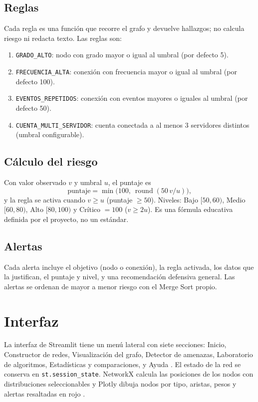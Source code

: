 \documentclass[12pt,a4paper]{article}
\begin{document}
\subsection{Reglas}
Cada regla es una función que recorre el grafo y devuelve hallazgos; no calcula riesgo ni redacta texto. Las reglas son:
\begin{enumerate}
  \item \texttt{GRADO\_ALTO}: nodo con grado mayor o igual al umbral (por defecto 5).
  \item \texttt{FRECUENCIA\_ALTA}: conexión con frecuencia mayor o igual al umbral (por defecto 100).
  \item \texttt{EVENTOS\_REPETIDOS}: conexión con eventos mayores o iguales al umbral (por defecto 50).
  \item \texttt{CUENTA\_MULTI\_SERVIDOR}: cuenta conectada a al menos 3 servidores distintos (umbral configurable).
\end{enumerate}

\subsection{Cálculo del riesgo}
Con valor observado $v$ y umbral $u$, el puntaje es
\[
  \text{puntaje} = \min\bigl(100,\ \operatorname{round}(50\,v/u)\bigr),
\]
y la regla se activa cuando $v\ge u$ (puntaje $\ge 50$). Niveles: Bajo $[50,60)$, Medio $[60,80)$, Alto $[80,100)$ y Crítico $=100$ ($v\ge 2u$). Es una fórmula educativa definida por el proyecto, no un estándar.

\subsection{Alertas}
Cada alerta incluye el objetivo (nodo o conexión), la regla activada, los datos que la justifican, el puntaje y nivel, y una recomendación defensiva general. Las alertas se ordenan de mayor a menor riesgo con el Merge Sort propio.

\section{Interfaz}
La interfaz de Streamlit tiene un menú lateral con siete secciones: Inicio, Constructor de redes, Visualización del grafo, Detector de amenazas, Laboratorio de algoritmos, Estadísticas y comparaciones, y Ayuda \cite{streamlitdocs}. El estado de la red se conserva en \texttt{st.session\_state}. NetworkX calcula las posiciones de los nodos con distribuciones seleccionables \cite{hagberg2008} y Plotly dibuja nodos por tipo, aristas, pesos y alertas resaltadas en rojo \cite{plotly2015}.
\end{document}
